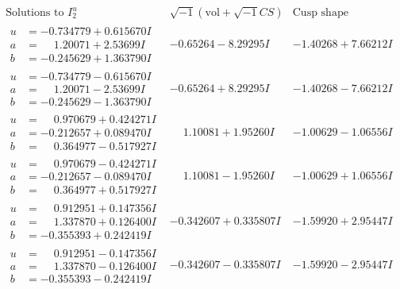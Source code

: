 \documentclass[1p]{elsarticle_modified}
\theoremstyle{definition}
\newcommand{\I}{\sqrt{-1}}
\begin{document}
$$\begin{array}{c|c|c}  
\text{Solutions to }I^u_{2}& \I (\text{vol} + \sqrt{-1}CS) & \text{Cusp shape}\\
 \hline 
\begin{aligned}
u &= -0.734779 + 0.615670 I \\
a &= \phantom{-}1.20071 + 2.53699 I \\
b &= -0.245629 + 1.363790 I\end{aligned}
 & -0.65264 - 8.29295 I & -1.40268 + 7.66212 I \\ \hline\begin{aligned}
u &= -0.734779 - 0.615670 I \\
a &= \phantom{-}1.20071 - 2.53699 I \\
b &= -0.245629 - 1.363790 I\end{aligned}
 & -0.65264 + 8.29295 I & -1.40268 - 7.66212 I \\ \hline\begin{aligned}
u &= \phantom{-}0.970679 + 0.424271 I \\
a &= -0.212657 + 0.089470 I \\
b &= \phantom{-}0.364977 - 0.517927 I\end{aligned}
 & \phantom{-}1.10081 + 1.95260 I & -1.00629 - 1.06556 I \\ \hline\begin{aligned}
u &= \phantom{-}0.970679 - 0.424271 I \\
a &= -0.212657 - 0.089470 I \\
b &= \phantom{-}0.364977 + 0.517927 I\end{aligned}
 & \phantom{-}1.10081 - 1.95260 I & -1.00629 + 1.06556 I \\ \hline\begin{aligned}
u &= \phantom{-}0.912951 + 0.147356 I \\
a &= \phantom{-}1.337870 + 0.126400 I \\
b &= -0.355393 + 0.242419 I\end{aligned}
 & -0.342607 + 0.335807 I & -1.59920 + 2.95447 I \\ \hline\begin{aligned}
u &= \phantom{-}0.912951 - 0.147356 I \\
a &= \phantom{-}1.337870 - 0.126400 I \\
b &= -0.355393 - 0.242419 I\end{aligned}
 & -0.342607 - 0.335807 I & -1.59920 - 2.95447 I \\ \hline\begin{aligned}

\end{aligned}
\end{array}$$
\end{document}
